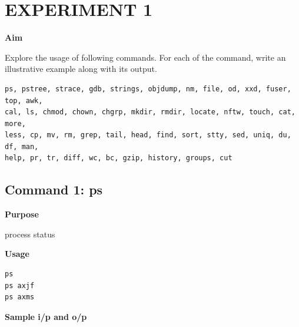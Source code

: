 \documentclass{article}
\begin{document}
\section{EXPERIMENT 1} %
\textbf{Aim}
\begin{flushleft}
Explore the usage of following commands. For each of the command, write an illustrative
example along with its output.
\end{flushleft}
\begin{verbatim}
ps, pstree, strace, gdb, strings, objdump, nm, file, od, xxd, fuser, top, awk,
cal, ls, chmod, chown, chgrp, mkdir, rmdir, locate, nftw, touch, cat, more,
less, cp, mv, rm, grep, tail, head, find, sort, stty, sed, uniq, du, df, man,
help, pr, tr, diff, wc, bc, gzip, history, groups, cut
\end{verbatim}
\subsection{Command 1: ps} 
\textbf{Purpose}
\begin{flushleft}
 process status
\end{flushleft}
\textbf{Usage}
\begin{verbatim}
ps
ps axjf
ps axms
\end{verbatim}
\textbf{Sample i/p and o/p}
\begin{figure}[H] 
\end{figure}
\end{document}
